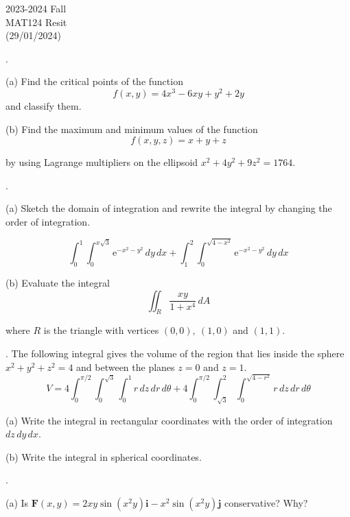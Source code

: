 \documentclass{article}
\begin{document}
\pagestyle{empty}
\large

\begin{center}
2023-2024 Fall \\MAT124 Resit\\(29/01/2024)
\end{center}

.

\hfill

\noindent (a) Find the critical points of the function
\[f(x,y)=4x^3-6xy+y^2+2y\]
\noindent and classify them.

\hfill

\noindent (b) Find the maximum and minimum values of the function
\[f(x,y,z)=x+y+z\]

\noindent by using Lagrange multipliers on the ellipsoid $x^2+4y^2+9z^2=1764$.

\hfill

.

\hfill

\noindent (a) Sketch the domain of integration and rewrite the integral by changing the order of integration.

\[\int_0^1\int_0^{x\sqrt3}\mathrm{e}^{-x^2-y^2}\,dy\,dx+\int_1^2\int_0^{\sqrt{4-x^2}}\mathrm{e}^{-x^2-y^2}\,dy\,dx\]

\hfill

\noindent (b) Evaluate the integral
\[\iint_R\frac{xy}{1+x^4}\,dA\]

\noindent where $R$ is the triangle with vertices $(0,0),\:(1,0)$ and $(1,1)$.

\hfill

. The following integral gives the volume of the region that lies inside the sphere $x^2+y^2+z^2=4$ and between the planes $z=0$ and $z=1$.
\[V=4\int_0^{\pi/2}\int_0^{\sqrt3}\int_0^1r\,dz\,dr\,d\theta+4\int_0^{\pi/2}\int_{\sqrt3}^2\int_0^{\sqrt{4-r^2}}r\,dz\,dr\,d\theta\]

\hfill

\noindent (a) Write the integral in rectangular coordinates with the order of integration $dz\,dy\,dx$.

\hfill

\noindent (b) Write the integral in spherical coordinates.

\hfill

.

\hfill

\noindent (a) Is $\mathbf{F}(x,y)=2xy\sin\left(x^2y\right)\mathbf{i}-x^2\sin\left(x^2y\right)\mathbf{j}$ conservative? Why?
\end{document}
